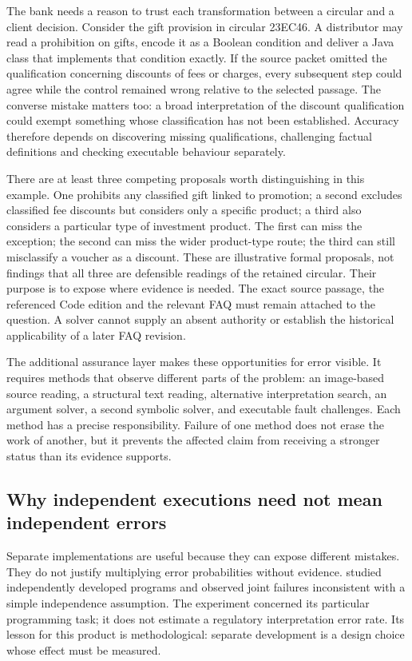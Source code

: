 \documentclass[12pt,a4paper,oneside,openany]{book}
\begin{document}
The bank needs a reason to trust each transformation between a circular and a
client decision. Consider the gift provision in circular 23EC46. A distributor
may read a prohibition on gifts, encode it as a Boolean condition and deliver a
Java class that implements that condition exactly. If the source packet omitted
the qualification concerning discounts of fees or charges, every subsequent
step could agree while the control remained wrong relative to the selected
passage. The converse mistake matters too: a broad interpretation of the
discount qualification could exempt something whose classification has not been
established. Accuracy therefore depends on discovering missing qualifications,
challenging factual definitions and checking executable behaviour separately.

There are at least three competing proposals worth distinguishing in this
example. One prohibits any classified gift linked to promotion; a second excludes
classified fee discounts but considers only a specific product; a third also
considers a particular type of investment product. The first can miss the
exception; the second can miss the wider product-type route; the third can still
misclassify a voucher as a discount. These are illustrative formal proposals,
not findings that all three are defensible readings of the retained circular.
Their purpose is to expose where evidence is needed. The exact source passage,
the referenced Code edition and the relevant FAQ must remain attached to the
question. A solver cannot supply an absent authority or establish the historical
applicability of a later FAQ revision.

The additional assurance layer makes these opportunities for error visible. It
requires methods that observe different parts of the problem: an image-based
source reading, a structural text reading, alternative interpretation search,
an argument solver, a second symbolic solver, and executable fault challenges.
Each method has a precise responsibility. Failure of one method does not erase
the work of another, but it prevents the affected claim from receiving a stronger
status than its evidence supports.

\subsection{Why independent executions need not mean independent errors}

Separate implementations are useful because they can expose different mistakes.
They do not justify multiplying error probabilities without evidence.
\citet{knight1986diversity} studied independently developed programs and observed
joint failures inconsistent with a simple independence assumption. The experiment
concerned its particular programming task; it does not estimate a regulatory
interpretation error rate. Its lesson for this product is methodological:
separate development is a design choice whose effect must be measured.
\end{document}
